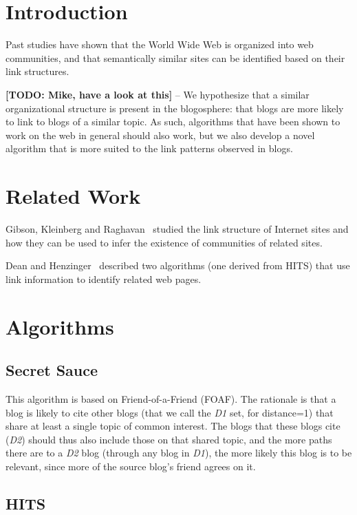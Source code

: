 \documentclass{sig-alternate}
\begin{document}


\section{Introduction}

Past studies have shown that the World Wide Web is organized into web
communities, and that semantically similar sites can be identified
based on their link structures.

\textbf{[TODO: Mike, have a look at this]} -- We hypothesize that a
similar organizational structure is present in the blogosphere: that
blogs are more likely to link to blogs of a similar topic. As such,
algorithms that have been shown to work on the web in general should
also work, but we also develop a novel algorithm that is more suited
to the link patterns observed in blogs.

\section{Related Work}

Gibson, Kleinberg and Raghavan~\cite{gibson1998iwc} studied the link
structure of Internet sites and how they can be used to infer the
existence of communities of related sites.

Dean and Henzinger~\cite{dean1999frp} described two algorithms (one
derived from HITS) that use link information to identify related web
pages.

\section{Algorithms}
\subsection{Secret Sauce}
This algorithm is based on Friend-of-a-Friend (FOAF). The rationale is
that a blog is likely to cite other blogs (that we call the \emph{D1}
set, for distance=1) that share at least a single topic of common
interest. The blogs that these blogs cite (\emph{D2}) should thus also
include those on that shared topic, and the more paths there are to a
\emph{D2} blog (through any blog in \emph{D1}), the more likely this
blog is to be relevant, since more of the source blog's friend agrees
on it.


\subsection{HITS}
\end{document}
